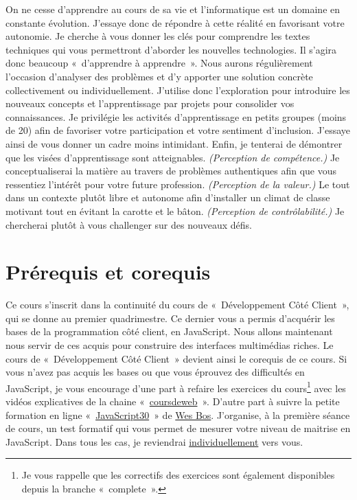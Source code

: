 On ne cesse d’apprendre au cours de sa vie et l’informatique est un domaine en constante évolution. J’essaye donc de répondre à cette réalité en favorisant votre autonomie. Je cherche à vous donner les clés pour comprendre les textes techniques qui vous permettront d’aborder les nouvelles technologies. Il s’agira donc beaucoup «~d’apprendre à apprendre~». Nous aurons régulièrement l’occasion d’analyser des problèmes et d’y apporter une solution concrète collectivement ou individuellement. J’utilise donc l'exploration pour introduire les nouveaux concepts et l’apprentissage par projets pour consolider vos connaissances. Je privilégie les activités d’apprentissage en petits groupes (moins de 20) afin de favoriser votre participation et votre sentiment d’inclusion. J’essaye ainsi de vous donner un cadre moins intimidant.
Enfin, je tenterai de démontrer que les visées d’apprentissage sont atteignables. \textit{(Perception de compétence.)} Je conceptualiserai la matière au travers de problèmes authentiques afin que vous ressentiez l'intérêt pour votre future profession. \textit{(Perception de la valeur.)} Le tout dans un contexte plutôt libre et autonome afin d'installer un climat de classe motivant \cite{viau1994motivation} tout en évitant la carotte et le bâton. \textit{(Perception de contrôlabilité.)} Je chercherai plutôt à vous challenger sur des nouveaux défis.

\clearpage
\section{Prérequis et corequis}

Ce cours s’inscrit dans la continuité du cours de «~Développement Côté Client~», qui se donne au premier quadrimestre. Ce dernier vous a permis d’acquérir les bases de la programmation côté client, en JavaScript. Nous allons maintenant nous servir de ces acquis pour construire des interfaces multimédias riches. Le cours de «~Développement Côté Client~» devient ainsi le corequis de ce cours.
Si vous n’avez pas acquis les bases ou que vous éprouvez des difficultés en JavaScript, je vous encourage d’une part à refaire les exercices du cours\footnote{Je vous rappelle que les correctifs des exercices sont également disponibles depuis la branche «~complete~».} avec les vidéos explicatives de la chaine «~\href{https://www.youtube.com/@coursdeweb}{coursdeweb}~». D’autre part à suivre la petite formation en ligne «~\href{https://javascript30.com}{JavaScript30}~» de \href{https://wesbos.com}{Wes Bos}. J'organise, à la première séance de cours, un test formatif qui vous permet de mesurer votre niveau de maitrise en JavaScript. Dans tous les cas, je reviendrai \underline{individuellement} vers vous.

